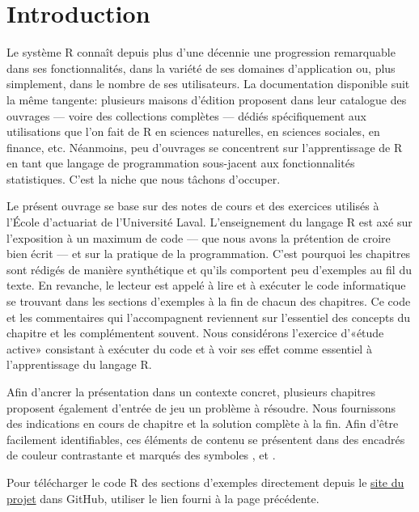 \chapter*{Introduction}

Le système R connaît depuis plus d'une décennie une progression
remarquable dans ses fonctionnalités, dans la variété de ses domaines
d'application ou, plus simplement, dans le nombre de ses utilisateurs.
La documentation disponible suit la même tangente: plusieurs maisons
d'édition proposent dans leur catalogue des ouvrages --- voire des
collections complètes --- dédiés spécifiquement aux utilisations que
l'on fait de R en sciences naturelles, en sciences sociales, en
finance, etc. Néanmoins, peu d'ouvrages se concentrent sur
l'apprentissage de R en tant que langage de programmation sous-jacent
aux fonctionnalités statistiques. C'est la niche que nous tâchons
d'occuper.

Le présent ouvrage se base sur des notes de cours et des exercices
utilisés à l'École d'actuariat de l'Université Laval. L'enseignement
du langage R est axé sur l'exposition à un maximum de code --- que
nous avons la prétention de croire bien écrit --- et sur la pratique
de la programmation. C'est pourquoi les chapitres sont rédigés de
manière synthétique et qu'ils comportent peu d'exemples au fil du
texte. En revanche, le lecteur est appelé à lire et à exécuter le code
informatique se trouvant dans les sections d'exemples à la fin de
chacun des chapitres. Ce code et les commentaires qui l'accompagnent
reviennent sur l'essentiel des concepts du chapitre et les
complémentent souvent. Nous considérons l'exercice d'«étude active»
consistant à exécuter du code et à voir ses effet comme essentiel à
l'apprentissage du langage R.

Afin d'ancrer la présentation dans un contexte concret, plusieurs
chapitres proposent également d'entrée de jeu un problème à résoudre.
Nous fournissons des indications en cours de chapitre et la solution
complète à la fin. Afin d'être facilement identifiables, ces éléments
de contenu se présentent dans des encadrés de couleur contrastante et
marqués des symboles {\faCogs}, {\faBolt} et {\faLightbulbO}.

Pour télécharger le code R des sections d'exemples directement depuis
le \href{https://vigou3.github.io/introduction-programmation-r/}{site
  du projet} dans GitHub, utiliser le lien fourni à la page
précédente.

